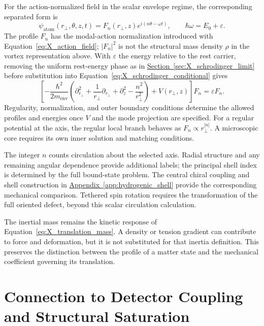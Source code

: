 For the action-normalized field in the scalar envelope regime, the corresponding separated form is
\begin{equation}
    \psi_{\mathrm{atom}}(r_\perp,\theta,z,t)
    =F_n(r_\perp,z)e^{i(n\theta-\omega t)},
    \qquad
    \hbar\omega=E_0+\varepsilon.
\end{equation}
The profile $F_n$ has the modal-action normalization introduced with Equation~\eqref{eq:X_action_field}; $|F_n|^2$ is not the structural mass density $\rho$ in the vortex representation above. With $\varepsilon$ the energy relative to the rest carrier, removing the uniform rest-energy phase as in \hyperref[sec:X_schrodinger_limit]{Section~\ref*{sec:X_schrodinger_limit}} before substitution into Equation~\eqref{eq:X_schrodinger_conditional} gives
\begin{equation}
    \left[
    -\frac{\hbar^2}{2m_{\mathrm{env}}}
    \left(
        \partial_{r_\perp}^2
        +\frac{1}{r_\perp}\partial_{r_\perp}
        +\partial_z^2-\frac{n^2}{r_\perp^2}
    \right)+V(r_\perp,z)
    \right]F_n=\varepsilon F_n.
    \label{eq:X_vortex_boundary_problem}
\end{equation}
Regularity, normalization, and outer boundary conditions determine the allowed profiles and energies once $V$ and the mode projection are specified. For a regular potential at the axis, the regular local branch behaves as $F_n\propto r_\perp^{|n|}$. A microscopic core requires its own inner solution and matching conditions.

The integer $n$ counts circulation about the selected axis. Radial structure and any remaining angular dependence provide additional labels; the principal shell index is determined by the full bound-state problem. The central chiral coupling and shell construction in \hyperref[app:hydrogenic_shell]{Appendix~\ref*{app:hydrogenic_shell}} provide the corresponding mechanical comparison. Tethered spin rotation requires the transformation of the full oriented defect, beyond this scalar circulation calculation.

The inertial mass remains the kinetic response of Equation~\eqref{eq:X_translation_mass}. A density or tension gradient can contribute to force and deformation, but it is not substituted for that inertia definition. This preserves the distinction between the profile of a matter state and the mechanical coefficient governing its translation.

\section{Connection to Detector Coupling and Structural Saturation}

